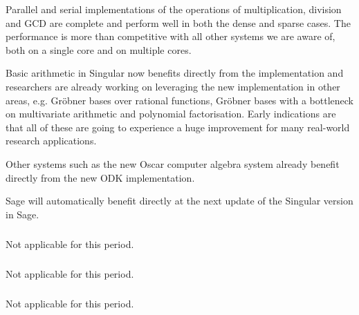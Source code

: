 Parallel and serial implementations of the operations of multiplication, division and GCD are complete and perform well in both the dense and sparse cases. The performance is more than competitive with all other systems we are aware of, both on a single core and on multiple cores.

Basic arithmetic in Singular now benefits directly from the implementation and researchers are already working on leveraging the new implementation in other areas, e.g. Gr\"{o}bner bases over rational functions, Gr\"{o}bner bases with a bottleneck on multivariate arithmetic and polynomial factorisation. Early indications are that all of these are going to experience a huge improvement for many real-world research applications.

Other systems such as the new Oscar computer algebra system already benefit directly from the new ODK implementation. 

Sage will automatically benefit directly at the next update of the Singular version in Sage.

  \subparagraph{}
  \label{hpc@hpc-mpir}

  Not applicable for this period.
  
  \subparagraph{}
  \label{hpc@hpc-combi}

  Not applicable for this period.


  \subparagraph{}
  \label{hpc@hpc-pythran}
  Not applicable for this period.




